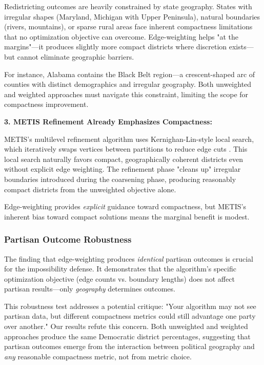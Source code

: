 Redistricting outcomes are heavily constrained by state geography. States with irregular shapes (Maryland, Michigan with Upper Peninsula), natural boundaries (rivers, mountains), or sparse rural areas face inherent compactness limitations that no optimization objective can overcome. Edge-weighting helps "at the margins"---it produces slightly more compact districts where discretion exists---but cannot eliminate geographic barriers.

For instance, Alabama contains the Black Belt region---a crescent-shaped arc of counties with distinct demographics and irregular geography. Both unweighted and weighted approaches must navigate this constraint, limiting the scope for compactness improvement.

\textbf{3. METIS Refinement Already Emphasizes Compactness:}

METIS's multilevel refinement algorithm uses Kernighan-Lin-style local search, which iteratively swaps vertices between partitions to reduce edge cuts \citep{karypis1998fast}. This local search naturally favors compact, geographically coherent districts even without explicit edge weighting. The refinement phase "cleans up" irregular boundaries introduced during the coarsening phase, producing reasonably compact districts from the unweighted objective alone.

Edge-weighting provides \textit{explicit} guidance toward compactness, but METIS's inherent bias toward compact solutions means the marginal benefit is modest.

\subsubsection{Partisan Outcome Robustness}

The finding that edge-weighting produces \textit{identical} partisan outcomes is crucial for the impossibility defense. It demonstrates that the algorithm's specific optimization objective (edge counts vs. boundary lengths) does not affect partisan results---only \textit{geography} determines outcomes.

This robustness test addresses a potential critique: "Your algorithm may not see partisan data, but different compactness metrics could still advantage one party over another." Our results refute this concern. Both unweighted and weighted approaches produce the same Democratic district percentages, suggesting that partisan outcomes emerge from the interaction between political geography and \textit{any} reasonable compactness metric, not from metric choice.

